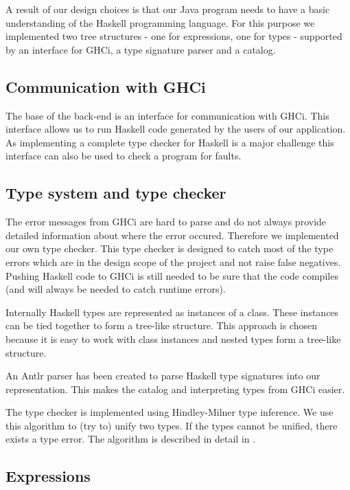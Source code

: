 A result of our design choices is that our Java program needs to have a basic understanding of the Haskell programming
language. For this purpose we implemented two tree structures - one for expressions, one for types - supported by an
interface for GHCi, a type signature parser and a catalog.

\subsection{Communication with GHCi}
\label{GHCi}

The base of the back-end is an interface for communication with GHCi. This interface allows us to run Haskell code
generated by the users of our application. As implementing a complete type checker for Haskell is a major challenge this
interface can also be used to check a program for faults.

\subsection{Type system and type checker}

The error messages from GHCi are hard to parse and do not always provide detailed information about where the error
occured. Therefore we implemented our own type checker. This type checker is designed to catch most of the type errors
which are in the design scope of the project and not raise false negatives. Pushing Haskell code to GHCi is still needed
to be sure that the code compiles (and will always be needed to catch runtime errors).

Internally Haskell types are represented as instances of a class. These instances can be tied together to form a
tree-like structure. This approach is chosen because it is easy to work with class instances and nested types form
a tree-like structure. 

An Antlr parser has been created to parse Haskell type signatures into our representation. This makes the catalog and interpreting types from GHCi easier.

The type checker is implemented using Hindley-Milner type inference. We use this algorithm to (try to) unify two
types. If the types cannot be unified, there exists a type error. The algorithm is described in detail in
\cite{borisov}.  

\subsection{Expressions}


